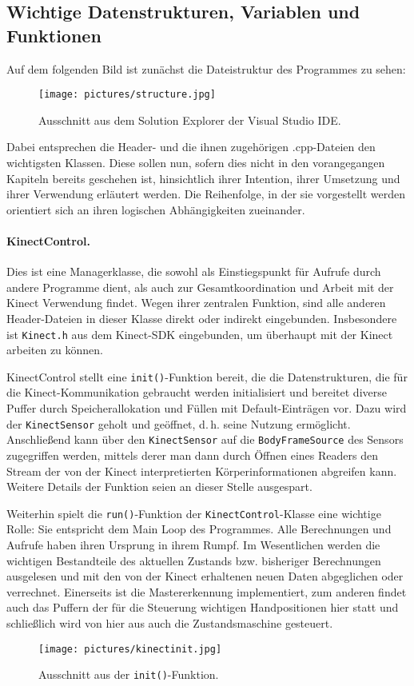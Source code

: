 	\subsection{Wichtige Datenstrukturen, Variablen und Funktionen}\label{sec:ds}
	Auf dem folgenden Bild ist zunächst die Dateistruktur des Programmes zu sehen:
	\begin{figure}[h]
	\centering
	\texttt{[image: pictures/structure.jpg]}
	\caption{Ausschnitt aus dem Solution Explorer der Visual Studio IDE.}
	\end{figure}
	Dabei entsprechen die Header- und die ihnen zugehörigen .cpp-Dateien den wichtigsten Klassen. Diese sollen nun, sofern dies nicht in den vorangegangen Kapiteln bereits geschehen ist, hinsichtlich ihrer Intention, ihrer Umsetzung und ihrer Verwendung erläutert werden. Die Reihenfolge, in der sie vorgestellt werden orientiert sich an ihren logischen Abhängigkeiten zueinander.\par\medskip
	\paragraph{KinectControl.} Dies ist eine Managerklasse, die sowohl als Einstiegspunkt für Aufrufe durch andere Programme dient, als auch zur Gesamtkoordination und Arbeit mit der Kinect Verwendung findet. Wegen ihrer zentralen Funktion, sind alle anderen Header-Dateien in dieser Klasse direkt oder indirekt eingebunden. Insbesondere ist \texttt{Kinect.h} aus dem Kinect-SDK eingebunden, um überhaupt mit der Kinect arbeiten zu können.\par 
	KinectControl stellt eine \texttt{init()}-Funktion bereit, die die Datenstrukturen, die für die Kinect-Kommunikation gebraucht werden initialisiert und bereitet diverse Puffer durch Speicherallokation und Füllen mit Default-Einträgen vor. Dazu wird der \texttt{KinectSensor} geholt und \glqq geöffnet\grqq{}, d.\,h. seine Nutzung ermöglicht. Anschließend kann über den \texttt{KinectSensor} auf die \texttt{BodyFrameSource} des Sensors zugegriffen werden, mittels derer man dann durch Öffnen eines Readers den Stream der von der Kinect interpretierten Körperinformationen abgreifen kann. Weitere Details der Funktion seien an dieser Stelle ausgespart.\par\smallskip
	Weiterhin spielt die \texttt{run()}-Funktion der \texttt{KinectControl}-Klasse eine wichtige Rolle: Sie entspricht dem \glqq Main Loop\grqq{} des Programmes. Alle Berechnungen und Aufrufe haben ihren Ursprung in ihrem Rumpf. Im Wesentlichen werden die wichtigen Bestandteile des aktuellen Zustands bzw. bisheriger Berechnungen ausgelesen und mit den von der Kinect erhaltenen neuen Daten abgeglichen oder verrechnet. Einerseits ist die Mastererkennung implementiert, zum anderen findet auch das Puffern der für die Steuerung wichtigen Handpositionen hier statt und schließlich wird von hier aus auch die Zustandsmaschine gesteuert.\par
	\begin{figure}[h]
	\centering
	\texttt{[image: pictures/kinectinit.jpg]}
	\caption{Ausschnitt aus der \texttt{init()}-Funktion.}
	\end{figure}
	\par\medskip
